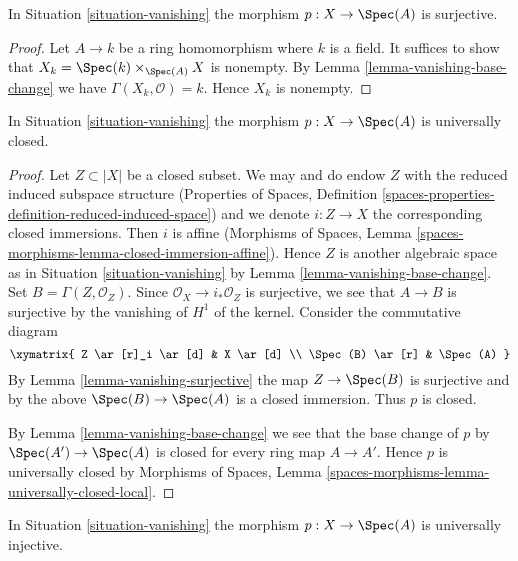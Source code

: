\begin{lemma}
\label{lemma-vanishing-surjective}
In Situation \ref{situation-vanishing} the morphism $p : X \to \Spec(A)$ is
surjective.
\end{lemma}

\begin{proof}
Let $A \to k$ be a ring homomorphism where $k$ is a field. It suffices to
show that $X_k = \Spec(k) \times_{\Spec(A)} X$ is nonempty. By
Lemma \ref{lemma-vanishing-base-change} we have
$\Gamma(X_k, \mathcal{O}) = k$. Hence $X_k$ is nonempty.
\end{proof}

\begin{lemma}
\label{lemma-vanishing-universally-closed}
In Situation \ref{situation-vanishing} the morphism $p : X \to \Spec(A)$ is
universally closed.
\end{lemma}

\begin{proof}
Let $Z \subset |X|$ be a closed subset. We may and do endow $Z$ with the
reduced induced subspace structure (Properties of Spaces, Definition
\ref{spaces-properties-definition-reduced-induced-space}) and we denote
$i : Z \to X$ the corresponding closed immersions. Then $i$ is affine
(Morphisms of Spaces, Lemma
\ref{spaces-morphisms-lemma-closed-immersion-affine}).
Hence $Z$ is another algebraic space as in Situation \ref{situation-vanishing}
by Lemma \ref{lemma-vanishing-base-change}.
Set $B = \Gamma(Z, \mathcal{O}_Z)$. Since $\mathcal{O}_X \to i_*\mathcal{O}_Z$
is surjective, we see that $A \to B$ is surjective by the vanishing of
$H^1$ of the kernel. Consider the commutative diagram
$$
\xymatrix{
Z \ar[r]_i \ar[d] & X \ar[d] \\
\Spec(B) \ar[r] & \Spec(A)
}
$$
By Lemma \ref{lemma-vanishing-surjective} the map $Z \to \Spec(B)$ is
surjective and by the above $\Spec(B) \to \Spec(A)$ is a closed immersion.
Thus $p$ is closed.

\medskip\noindent
By Lemma \ref{lemma-vanishing-base-change} we see that the base change
of $p$ by $\Spec(A') \to \Spec(A)$ is closed for every ring map $A \to A'$.
Hence $p$ is universally closed by
Morphisms of Spaces, Lemma
\ref{spaces-morphisms-lemma-universally-closed-local}.
\end{proof}

\begin{lemma}
\label{lemma-vanishing-injective}
In Situation \ref{situation-vanishing} the morphism $p : X \to \Spec(A)$ is
universally injective.
\end{lemma}

